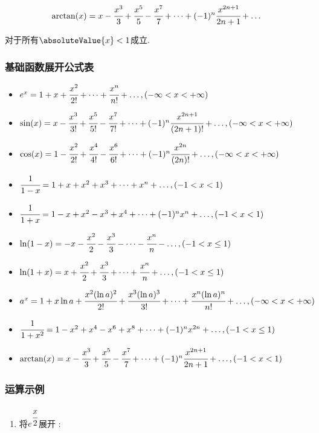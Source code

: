 {{{{\begin{enumerate}
{            $$
              \arctan(x) = x - \cfrac{x^3}{3} + \cfrac{x^5}{5} - \cfrac{x^7}{7} + \dots + (-1)^n\cfrac{x^{2n + 1}}{2n + 1} + \dots
            $$

            对于所有$\absoluteValue{x} < 1$成立.
            }
    \end{enumerate}
  }%

  \subsubsection{基础函数展开公式表}{
    \begin{itemize}
      \item $e^x = 1 + x + \cfrac{x^2}{2!} + \dots + \cfrac{x^n}{n!} + \dots,(-\infty < x < +\infty)$
      \item $\sin(x) = x - \cfrac{x^3}{3!} + \cfrac{x^5}{5!} - \cfrac{x^7}{7!} + \dots + (-1)^n\cfrac{x^{2n + 1}}{(2n + 1)!} + \dots,(-\infty < x < +\infty)$
      \item $\cos(x) = 1 - \cfrac{x^2}{2!} + \cfrac{x^4}{4!} - \cfrac{x^6}{6!} + \dots + (-1)^n\cfrac{x^{2n}}{(2n)!} + \dots,(-\infty < x < +\infty)$
      \item $\cfrac{1}{1 - x} = 1 + x + x^2 + x^3 + \dots + x^n + \dots,(-1 < x < 1)$
      \item $\cfrac{1}{1 + x} = 1 - x + x^2 - x^3 + x^4 + \dots + (-1)^nx^n + \dots,(-1 < x < 1)$
      \item $\ln(1 - x) = -x - \cfrac{x^2}{2} - \cfrac{x^3}{3} - \dots - \cfrac{x^n}{n} - \dots,(-1 < x \leq 1)$
      \item $\ln(1 + x) = x + \cfrac{x^2}{2} + \cfrac{x^3}{3} + \dots + \cfrac{x^n}{n} + \dots,(-1 < x \leq 1)$
      \item $a^x = 1 + x\ln a + \cfrac{x^2(\ln a)^2}{2!} + \cfrac{x^3(\ln a)^3}{3!} + \dots + \cfrac{x^n(\ln a)^n}{n!} + \dots,(-\infty < x < +\infty)$
      \item $\cfrac{1}{1 + x^2} = 1 - x^2 + x^4 - x^6 + x^8 + \dots + (-1)^nx^{2n} + \dots,(-1 < x \leq 1)$
      \item $\arctan(x) = x - \cfrac{x^3}{3} + \cfrac{x^5}{5} - \cfrac{x^7}{7} + \dots + (-1)^n\cfrac{x^{2n + 1}}{2n + 1} + \dots,(-1 < x < 1)$
    \end{itemize}
  }%

  \subsubsection{运算示例}{
    \begin{enumerate}
      \item {
            将$e^{\cfrac{x}{2}}$展开 :

}
\end{enumerate}}}}}

